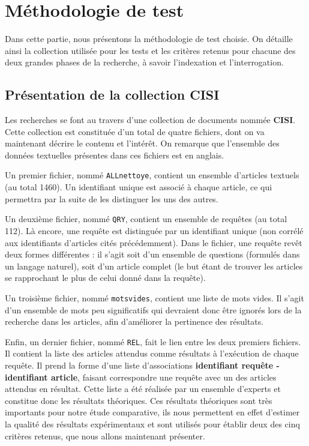 \section{Méthodologie de test}
\label{section:methodologie}

Dans cette partie, nous présentons la méthodologie de test choisie. On détaille ainsi la collection utilisée pour les tests et les critères retenus pour chacune des deux grandes phases de la recherche, à savoir l’indexation et l’interrogation.

\subsection{Présentation de la collection CISI}
\label{section:presentationCISI}
Les recherches se font au travers d'une collection de documents nommée \textbf{CISI}. Cette collection est constituée d’un total de quatre fichiers, dont on va maintenant décrire le contenu et l’intérêt. On remarque que l’ensemble des données textuelles présentes dans ces fichiers est en anglais.

Un premier fichier, nommé \texttt{ALLnettoye}, contient un ensemble d'articles textuels (au total 1460). Un identifiant unique est associé à chaque article, ce qui permettra par la suite de les distinguer les uns des autres.

Un deuxième fichier, nommé \texttt{QRY}, contient un ensemble de requêtes (au total 112). Là encore, une requête est distinguée par un identifiant unique (non corrélé aux identifiants d’articles cités précédemment). Dans le fichier, une requête revêt deux formes différentes : il s’agit soit d’un ensemble de questions (formulés dans un langage naturel), soit d’un article complet (le but étant de trouver les articles se rapprochant le plus de celui donné dans la requête). 

Un troisième fichier, nommé \texttt{motsvides}, contient une liste de mots vides. Il s’agit d’un ensemble de mots peu significatifs qui devraient donc être ignorés lors de la recherche dans les articles, afin d’améliorer la pertinence des résultats.

Enfin, un dernier fichier, nommé \texttt{REL}, fait le lien entre les deux premiers fichiers. Il contient la liste des articles attendus comme résultats à l'exécution de chaque requête. Il prend la forme d'une liste d'associations \textbf{identifiant requête - identifiant article}, faisant correspondre une requête avec un des articles attendus en résultat. Cette liste a été réalisée par un ensemble d'experts et constitue donc les résultats théoriques. Ces résultats théoriques sont très importants pour notre étude comparative, ils nous permettent en effet d’estimer la qualité des résultats expérimentaux et sont utilisés pour établir deux des cinq critères retenus, que nous allons maintenant présenter.


